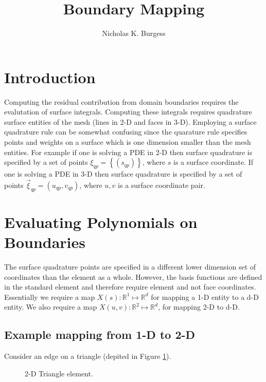 \documentclass[letterpaper]{article}
\title{Boundary Mapping}
\author{Nicholas K. Burgess}
\newcommand{\figref}[1]{Figure \ref{#1}}                %
\begin{document}
\maketitle
\section{Introduction} 
Computing the residual contribution from domain boundaries requires the evalutation of surface integrals.  Computing these integrals requires quadrature surface entities of the mesh (lines in 2-D and faces in 3-D).  Employing a surface quadrature rule can be somewhat confusing since the quarature rule specifies points and weights on a surface which is one dimension smaller than the mesh entities.  For example if one is solving a PDE in 2-D then surface quadrature is specified by a set of points $\xi_{qp}=\left\{(s_{qp})\right\}$, where $s$ is a surface coordinate.  If one is solving a PDE in 3-D then surface quadrature is specified by a set of points $\vec{\xi}_{qp} ={(u_{qp},v_{qp})}$, where $u,v$ is a surface coordinate pair.    

\section{Evaluating Polynomials on Boundaries}
The surface quadrature points are specified in a different lower dimension set of coordinates than the element as a whole.  However, the basis functions are defined in the standard element and therefore require element and not face coordinates.  Essentially we require a map $X(s): \mathbb{R}^{1} \mapsto \mathbb{R}^{d}$ for mapping a 1-D entity to a d-D entity.  We also require a map $X(u,v) :\mathbb{R}^{2} \mapsto \mathbb{R}^{d}$, for mapping 2-D to d-D.    

\subsection{Example mapping from 1-D to 2-D}
Consider an edge on a triangle (depited in \figref{fig:tri}).  
\begin{figure}
\centering
{}
\caption{2-D Triangle element.}
\label{fig:tri}
\end{figure}
\end{document}
